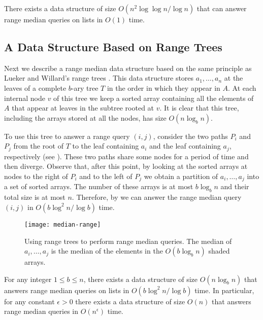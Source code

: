 \documentclass{njcarticle}
\begin{document}
\begin{theorem}
There exists a data structure of size $O(n^2\log\log n/\log n)$ that can
answer range median queries on lists in $O(1)$ time.
\end{theorem}

\subsection{A Data Structure Based on Range Trees}

Next we describe a range median data structure based on the same
principle as Lueker and Willard's range trees
.  This
data structure stores $a_1,\ldots,a_n$ at the leaves of a complete
$b$-ary tree $T$ in the order in which they appear in $A$.  At each
internal node $v$ of this tree we keep a sorted array containing all
the elements of $A$ that appear at leaves in the subtree rooted at
$v$.  It is clear that this tree, including the arrays stored at all
the nodes, has size $O(n\log_b n)$.

To use this tree to answer a range query $(i,j)$, consider the two
paths $P_i$ and $P_j$ from the root of $T$ to the leaf containing
$a_i$ and the leaf containing $a_j$, respectively (see
).  These two paths share some nodes for a period
of time and then diverge.  Observe that, after this point, by looking
at the sorted arrays at nodes to the right of $P_i$ and to the left of
$P_j$ we obtain a partition of $a_i,\ldots,a_j$ into a set of sorted
arrays.  The number of these arrays is at most $b\log_b n$ and their
total size is at most $n$.  Therefore, by 
we can answer the range median query $(i,j)$ in $O(b\log^2 n/\log b)$
time. 

\begin{figure}
\begin{center}\texttt{[image: median-range]}\end{center}
\caption{Using range trees to perform range median queries. The median of $a_i,\ldots,a_j$ is the median of the elements in the $O(b\log_b n)$ shaded arrays.}
\end{figure}


\begin{theorem} 
For any integer $1\le b\le n$, there exists a data structure of size
$O(n\log_b n)$ that answers range median queries on lists in
$O(b\log^2 n/\log b)$ time.  In particular, for any constant
$\epsilon>0$ there exists a data structure of size $O(n)$ that answers
range median queries in $O(n^\epsilon)$ time.  
\end{theorem}
\end{document}
